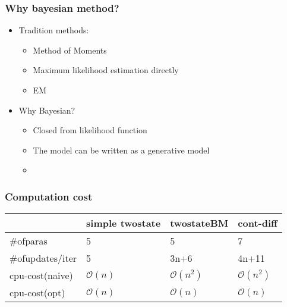 \documentclass[11pt]{beamer}
\newcommand{\bit}{\begin{itemize}\setlength{\itemsep}{0cm}\setlength{\topsep}{0cm}}
\newcommand{\eit}{\end{itemize}}
\newcommand{\bQ}{{\bf Q}}
\newcommand{\bH}{{\bf H}}
\newcommand{\bD}{{\bf D}}
\newcommand{\btau}{{\boldsymbol{\tau}}}
\newcommand{\bt}{{\bf t}}
\begin{document}
\begin{frame}
\frametitle{Why bayesian method?}
\bit
\pause
\item Tradition methods: 
\bit
\item Method of Moments
\item Maximum likelihood estimation directly
\item EM
\eit
\pause
\item Why Bayesian?
\bit 
\item Closed from likelihood function
\item The model can be written as a generative model
\item \color{red}{Informative prior}
\eit
\eit
\end{frame}
\begin{frame}
\frametitle{Computation cost}
{\small
\begin{table}
\centering
\begin{tabular}{llll}
\hline
 & simple twostate & twostateBM & cont-diff\\ \hline
$\#$ofparas & 5 & 5 & 7\\
$\#$ofupdates/iter & 5 & 3n+6 & 4n+11\\
cpu-cost(naive)& $\mathcal{O}(n)$&$\mathcal{O}(n^2)$ & $\mathcal{O}(n^2)$\\
cpu-cost(opt)&$\mathcal{O}(n)$&$\mathcal{O}(n)$&$\mathcal{O}(n)$\\ \hline

\end{tabular}
\end{table} }
\end{frame}
\end{document}
